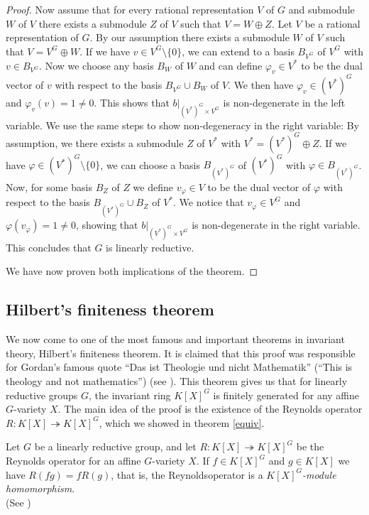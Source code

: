 \begin{proof}
  Now assume that for every rational representation $V$ of $G$ and submodule $W$ of $V$ there exists a submodule $Z$ of $V$ such that $V = W \oplus Z$.
  Let $V$ be a rational representation of $G$.
  By our assumption there exists a submodule $W$ of $V$ such that $V = V^G \oplus W$.
  If we have $v \in V^G \setminus \{0\}$, we can extend to a basis $B_{V^G}$ of $V^G$ with $v \in B_{V^G}$.
  Now we choose any basis $B_W$ of $W$ and can define $\varphi_v \in V^\ast$ to be the dual vector of $v$ with respect to the basis $B_{V^G} \cup B_W$ of $V$.
  We then have $\varphi_v \in (V^\ast)^G $ and $\varphi_v (v) = 1 \neq 0$.
  This shows that $\left. b\right|_{(V^\ast)^G \times V^G}$ is non-degenerate in the left variable.
  We use the same steps to show non-degeneracy in the right variable:
  By assumption, we there exists a submodule $Z$ of $V^\ast$ with $V^\ast = (V^\ast)^G \oplus Z$.
  If we have $\varphi \in (V^\ast)^G \setminus\{0\}$, we can choose a basis $B_{(V^\ast)^G}$ of $(V^\ast)^G$ with $\varphi \in B_{(V^\ast)^G}$.
  Now, for some basis $B_Z$ of $Z$ we define $v_\varphi \in V$ to be the dual vector of $\varphi$ with respect to the basis $B_{(V^\ast)^G}\cup B_Z$ of $V^\ast$.
  We notice that $v_\varphi \in V^G$ and $\varphi(v_\varphi) = 1 \neq 0$, showing that $\left. b\right|_{(V^\ast)^G \times V^G}$ is non-degenerate in the right variable.
  This concludes that $G$ is linearly reductive.
  
  We have now proven both implications of the theorem.
\end{proof}

\subsection{Hilbert's finiteness theorem}

We now come to one of the most famous and important theorems in invariant theory, Hilbert's finiteness theorem.
It is claimed that this proof was responsible for Gordan's famous quote ``Das ist Theologie und nicht Mathematik'' (``This is theology and not mathematics'') (see \cite[p.42]{DK15}).
This theorem gives us that for linearly reductive groups $G$, the invariant ring $K[X]^G$ is finitely generated for any affine $G$-variety $X$.
The main idea of the proof is the existence of the Reynolds operator $R \colon K[X] \twoheadrightarrow K[X]^G$, which we showed in theorem \ref{equiv}. 

\begin{proposition}
  Let $G$ be a linearly reductive group, and let \linebreak$ R \colon K[X] \twoheadrightarrow K[X]^G $ be the Reynolds operator for an affine $G$-variety $X$.
  If $f \in K[X]^G$ and $g \in K[X]$ we have $R(fg) = fR(g)$, that is, the Reynolds\linebreak operator is a \textit{$K[X]^G$-module homomorphism}.  \\
  (See \cite[2.2.7]{DK15})
\end{proposition}


